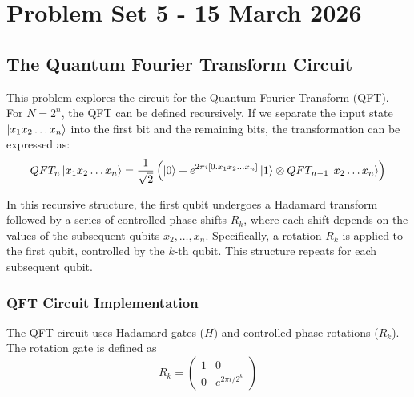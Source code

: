 \section{Problem Set 5 - 15 March 2026}
\subsection{The Quantum Fourier Transform Circuit}
This problem explores the circuit for the Quantum Fourier Transform (QFT). \\

For $N = 2^n$, the QFT can be defined recursively. If we separate the input state $\ket{x_1x_2\ldots x_n}$ into the first bit and the remaining bits, the transformation can be expressed as:
\begin{equation}
    QFT_n\ket{x_1x_2\ldots x_n} = \frac{1}{\sqrt{2}}\left(\ket{0} + e^{2\pi i [0.x_1x_2\ldots x_n]}\ket{1} \otimes QFT_{n-1}\ket{x_2\ldots x_n}\right)
\end{equation}
 
In this recursive structure, the first qubit undergoes a Hadamard transform followed by a series of controlled phase shifts $R_k$, where each shift depends on the values of the subsequent qubits $x_2, \ldots, x_n$. Specifically, a rotation $R_k$ is applied to the first qubit, controlled by the $k$-th qubit. This structure repeats for each subsequent qubit.

\subsubsection{QFT Circuit Implementation}
The QFT circuit uses Hadamard gates ($H$) and controlled-phase rotations ($R_k$). The rotation gate is defined as
\begin{equation}
    R_k = \begin{pmatrix}
        1 & 0 \\ 0 & e^{2\pi i/2^k}
    \end{pmatrix}
\end{equation}

